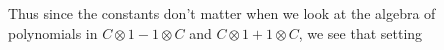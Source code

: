 Thus since the constants don't matter when we look at the algebra of polynomials in $C\otimes 1 - 1\otimes C$ and $C\otimes 1 + 1\otimes C$, we see that setting

